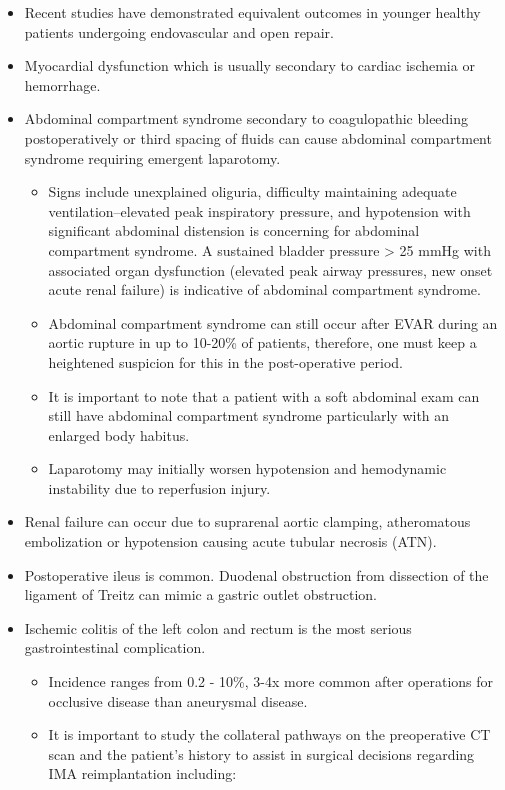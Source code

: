 \documentclass[
]{book}
\begin{document}
\begin{itemize}
\item
  Recent studies have demonstrated equivalent outcomes in younger
  healthy patients undergoing endovascular and open repair.
  \citep{liangComparablePerioperativeMortality2018}
\item
  Myocardial dysfunction which is usually secondary to cardiac
  ischemia or hemorrhage.
\item
  Abdominal compartment syndrome secondary to coagulopathic bleeding
  postoperatively or third spacing of fluids can cause abdominal
  compartment syndrome requiring emergent laparotomy.\citep{cheatham2007, mehta2005, rasmussen1997}

  \begin{itemize}
  \item
    Signs include unexplained oliguria, difficulty maintaining
    adequate ventilation--elevated peak inspiratory pressure, and
    hypotension with significant abdominal distension is concerning
    for abdominal compartment syndrome. A sustained bladder pressure
    \textgreater{} 25 mmHg with associated organ dysfunction (elevated peak
    airway pressures, new onset acute renal failure) is indicative
    of abdominal compartment syndrome.
  \item
    Abdominal compartment syndrome can still occur after EVAR during
    an aortic rupture in up to 10-20\% of patients, therefore, one
    must keep a heightened suspicion for this in the post-operative
    period.\citep{veith2009}
  \item
    It is important to note that a patient with a soft abdominal
    exam can still have abdominal compartment syndrome particularly
    with an enlarged body habitus.
  \item
    Laparotomy may initially worsen hypotension and hemodynamic
    instability due to reperfusion injury.
  \end{itemize}
\item
  Renal failure can occur due to suprarenal aortic clamping,
  atheromatous embolization or hypotension causing acute tubular
  necrosis (ATN).
\item
  Postoperative ileus is common. Duodenal obstruction from dissection
  of the ligament of Treitz can mimic a gastric outlet obstruction.
\item
  Ischemic colitis of the left colon and rectum is the most serious
  gastrointestinal complication.\citep{moghadamyeghaneh2016}

  \begin{itemize}
  \item
    Incidence ranges from 0.2 - 10\%, 3-4x more common after
    operations for occlusive disease than aneurysmal disease.
  \item
    It is important to study the collateral pathways on the
    preoperative CT scan and the patient's history to assist in
    surgical decisions regarding IMA reimplantation including:


\end{itemize}
\end{itemize}
\end{document}
